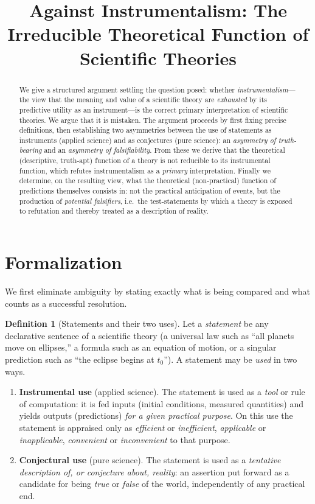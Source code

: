 \documentclass{amsart}
\theoremstyle{definition}
\newtheorem{definition}{Definition}
\theoremstyle{plain}
\begin{document}
\title{Against Instrumentalism: The Irreducible Theoretical Function of
Scientific Theories}
\maketitle

\begin{abstract}
We give a structured argument settling the question posed: whether
\emph{instrumentalism}---the view that the meaning and value of a scientific
theory are \emph{exhausted} by its predictive utility as an instrument---is the
correct primary interpretation of scientific theories. We argue that it is
mistaken. The argument proceeds by first fixing precise definitions, then
establishing two asymmetries between the use of statements as instruments
(applied science) and as conjectures (pure science): an \emph{asymmetry of
truth-bearing} and an \emph{asymmetry of falsifiability}. From these we derive
that the theoretical (descriptive, truth-apt) function of a theory is not
reducible to its instrumental function, which refutes instrumentalism as a
\emph{primary} interpretation. Finally we determine, on the resulting view,
what the theoretical (non-practical) function of predictions themselves
consists in: not the practical anticipation of events, but the production of
\emph{potential falsifiers}, i.e.\ the test-statements by which a theory is
exposed to refutation and thereby treated as a description of reality.
\end{abstract}

\section{Formalization}

We first eliminate ambiguity by stating exactly what is being compared and
what counts as a successful resolution.

\begin{definition}[Statements and their two uses]\label{def:uses}
Let a \emph{statement} be any declarative sentence of a scientific theory
(a universal law such as ``all planets move on ellipses,'' a formula such as
an equation of motion, or a singular prediction such as ``the eclipse begins
at $t_0$''). A statement may be \emph{used} in two ways.
\begin{enumerate}
\item[(A)] \textbf{Instrumental use} (applied science). The statement is used
as a \emph{tool} or rule of computation: it is fed inputs (initial conditions,
measured quantities) and yields outputs (predictions) \emph{for a given
practical purpose}. On this use the statement is appraised only as
\emph{efficient} or \emph{inefficient}, \emph{applicable} or
\emph{inapplicable}, \emph{convenient} or \emph{inconvenient} to that purpose.
\item[(C)] \textbf{Conjectural use} (pure science). The statement is used as a
\emph{tentative description of, or conjecture about, reality}: an assertion put
forward as a candidate for being \emph{true} or \emph{false} of the world,
independently of any practical end.
\end{enumerate}
\end{definition}
\end{document}
